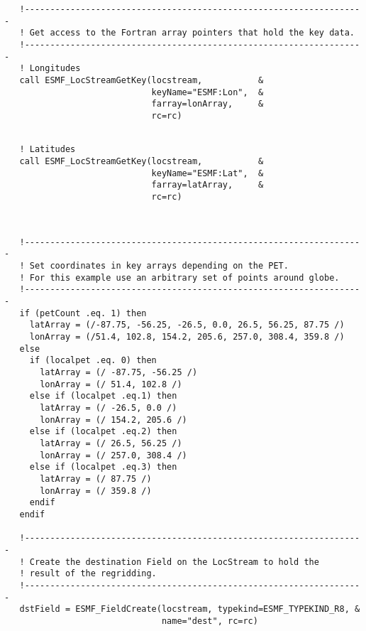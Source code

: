 
 \begin{verbatim}
   !-------------------------------------------------------------------
   ! Get access to the Fortran array pointers that hold the key data.
   !-------------------------------------------------------------------
   ! Longitudes
   call ESMF_LocStreamGetKey(locstream,           &
                             keyName="ESMF:Lon",  &
                             farray=lonArray,     &
                             rc=rc)
 
\end{verbatim}
 

 \begin{verbatim}
   ! Latitudes
   call ESMF_LocStreamGetKey(locstream,           &
                             keyName="ESMF:Lat",  &
                             farray=latArray,     &
                             rc=rc)
 
\end{verbatim}
 

 \begin{verbatim}

   !-------------------------------------------------------------------
   ! Set coordinates in key arrays depending on the PET.
   ! For this example use an arbitrary set of points around globe.  
   !-------------------------------------------------------------------
   if (petCount .eq. 1) then
     latArray = (/-87.75, -56.25, -26.5, 0.0, 26.5, 56.25, 87.75 /)
     lonArray = (/51.4, 102.8, 154.2, 205.6, 257.0, 308.4, 359.8 /)
   else
     if (localpet .eq. 0) then
       latArray = (/ -87.75, -56.25 /)
       lonArray = (/ 51.4, 102.8 /)
     else if (localpet .eq.1) then
       latArray = (/ -26.5, 0.0 /)
       lonArray = (/ 154.2, 205.6 /)
     else if (localpet .eq.2) then
       latArray = (/ 26.5, 56.25 /)
       lonArray = (/ 257.0, 308.4 /)
     else if (localpet .eq.3) then
       latArray = (/ 87.75 /)
       lonArray = (/ 359.8 /)
     endif
   endif

   !-------------------------------------------------------------------
   ! Create the destination Field on the LocStream to hold the 
   ! result of the regridding. 
   !-------------------------------------------------------------------
   dstField = ESMF_FieldCreate(locstream, typekind=ESMF_TYPEKIND_R8, &
                               name="dest", rc=rc)
 
\end{verbatim}
 
